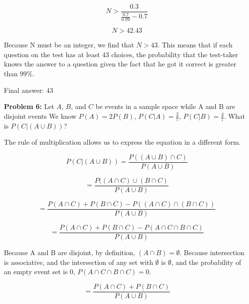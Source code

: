 \documentclass{article}
\begin{document}
 \begin{displaymath}
    N > \frac{0.3}{\frac{0.7}{0.99} - 0.7}
 \end{displaymath}
 
 \begin{displaymath}
    N > 42.43
 \end{displaymath}
 
 Because N must be an integer, we find that $N > 43$. This means that if each question on the test has at least 43 choices, the probability that the test-taker knows the answer to a question given the fact that he got it correct is greater than $99\%$.
 
 Final answer: $43$\newline
 
 \newpage
 
 \begin{center}
     \Large\textbf{Problem 6:} Let $A$, $B$, and $C$ be events in a sample space while A and B are disjoint events We know $P(A) = 2P(B)$, $P(C|A) = \frac{2}{7}$, $P(C|B) = \frac{4}{7}$. What is $P(C|(A \cup B))$?\par
 \end{center}
 
 The rule of multiplication allows us to express the equation in a different form.
 
 \begin{equation}
    P(C|(A \cup B)) = \frac{P((A \cup B) \cap C)}{P(A \cup B)}
 \end{equation}
 
 \begin{equation}
    = \frac{P((A \cap C) \cup (B \cap C)}{P(A \cup B)}
 \end{equation}
 
 \begin{equation}
    = \frac{P(A \cap C) + P(B \cap C) - P((A \cap C) \cap (B \cap C))}{P(A \cup B)} 
 \end{equation}
 
 \begin{equation}
    = \frac{P(A \cap C) + P(B \cap C) - P(A \cap C \cap B \cap C)}{P(A \cup B)}
 \end{equation}
 
 Because A and B are disjoint, by definition, $(A \cap B) = \emptyset$. Because intersection is associative, and the intersection of any set with $\emptyset$ is $\emptyset$, and the probability of an empty event set is $0$, $P(A \cap C \cap B \cap C) = 0$.
 
 \begin{equation}
    = \frac{P(A \cap C) + P(B \cap C)}{P(A \cup B)}
 \end{equation}
 
\end{document}
